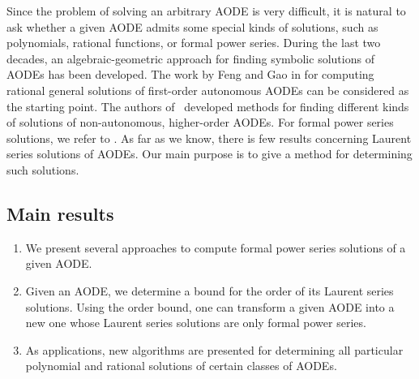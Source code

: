 \documentclass[10pt,a4paper]{article}
\begin{document}
Since the problem of solving an arbitrary AODE is very difficult, 
it is natural to ask whether a given AODE admits some special kinds of solutions, 
such as polynomials, rational functions, or formal power series. 
During the last two decades, an algebraic-geometric approach for finding symbolic solutions of AODEs has been developed. 
The work by Feng and Gao in \cite{FengGao, FengGao06} for computing rational general solutions of first-order autonomous AODEs 
can be considered as the starting point. 
The authors of~\cite{NgoWinkler11b, GraseggerThesis, VoWinkler2015, VoGraseggerWinkler2017} 
developed methods for finding different kinds of solutions of non-autonomous, higher-order AODEs. 
For formal power series solutions, we refer to \cite{DenefLipshitz,SingerFormalSolutions}.
As far as we know, there is few results concerning Laurent series solutions of AODEs. 
Our main purpose is to give a method for determining such solutions.

\subsection{Main results}

\begin{enumerate}
 \item We present several approaches to compute formal power series solutions of a given AODE.
 \item Given an AODE, we determine a bound for the order of its Laurent series solutions. 
 Using the order bound, one can transform a given AODE into a new one whose Laurent series solutions are only formal power series.
 \item As applications, new algorithms are presented for determining all particular polynomial and rational solutions of certain classes of AODEs.
\end{enumerate}

\end{document}
